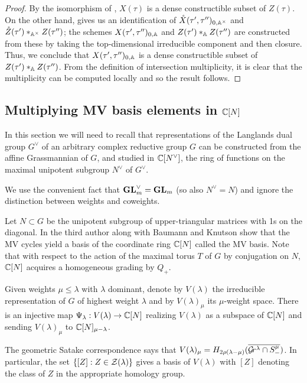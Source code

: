 \documentclass{article}
\begin{document}
\begin{proof}
By the isomorphism of , $X(\tau) $ is a dense constructible subset of $ Z(\tau) $.  On the other hand,  gives us an identification of $ \mathring X(\tau',\tau'')_{0, \Ax}$ and $ \mathring Z(\tau') \ast_{\Ax} Z(\tau'')$; the schemes $ X(\tau', \tau'')_{0,\AA} $ and $ Z(\tau') \ast_\AA Z(\tau'') $ are constructed from these by taking the top-dimensional irreducible component and then closure.  Thus, we conclude that $ X(\tau', \tau'')_{0,\AA} $ is a dense constructible subset of $ Z(\tau') \ast_\AA Z(\tau'') $.  From the definition of intersection multiplicity, it is clear that the multiplicity can be computed locally and so the result follows.
\end{proof}
% 

% 
\subsection{Multiplying MV basis elements in \texorpdfstring{$\CC[N]$}{C[N]}}
\label{ss:CN}
% 
In this section we will need to recall that representations of the Langlands dual group $G^\vee$ of an arbitrary complex reductive group $G$ can be constructed from the affine Grassmannian of $G$, and studied in $\CC[N^\vee]$, the ring of functions on the maximal unipotent subgroup $N^\vee$ of $G^\vee$. 
% 

We use the convenient fact that $\GL_m^\vee = \GL_m$ (so also $N^\vee = N$) and ignore the distinction between weights and coweights. 

Let $N\subset G$ be the unipotent subgroup of upper-triangular matrices with 1s on the diagonal. In \cite{baumann2019mirkovic} the third author along with Baumann and Knutson show that the MV cycles yield a basis of the coordinate ring $\CC[N]$ called the MV basis. Note that with respect to the action of the maximal torus $T$ of $G$ by conjugation on $N$, $\CC[N]$ acquires a homogeneous grading by $Q_+$. 
% 

Given weights $\mu\le\lambda$ with $\lambda$ dominant, denote by $V(\lambda)$ the irreducible representation of $G$ of highest weight $\lambda$ and by $V(\lambda)_\mu$ its $\mu$-weight space. 
There is an injective map $ \Psi_\lambda: V(\lambda) \to \CC[N]$ realizing $V(\lambda)$ as a subspace of $\CC[N]$ and sending $ V(\lambda)_\mu$ to $\CC[N]_{\mu - \lambda}$. 

The geometric Satake correspondence says that $V(\lambda)_\mu = H_{2\rho(\lambda-\mu)}(\overline{\Gr^\lambda\cap S^\mu_-})$. In particular, the set $\{[Z] : Z\in\cZ(\lambda)\}$ gives a basis of $V(\lambda)$ with $[Z]$ denoting the class of $Z$ in the appropriate homology group. 
% 
\end{document}
